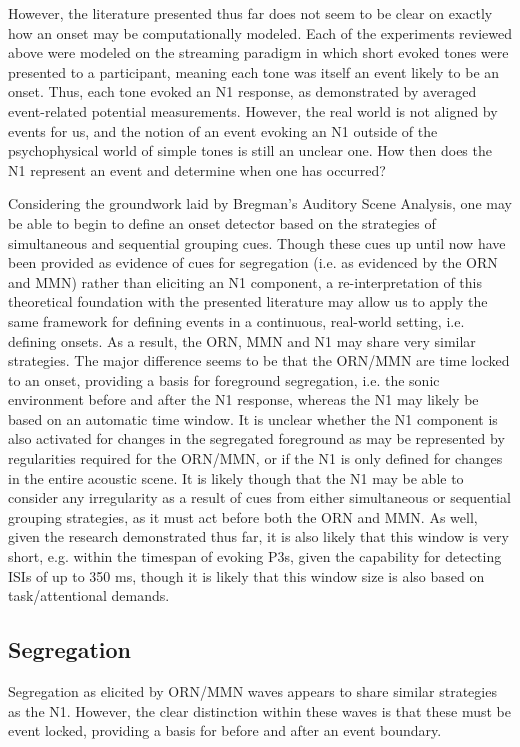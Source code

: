 \documentclass[a4paper,10pt,final]{ThesisStyle}
\begin{document}
However, the literature presented thus far does not seem to be clear on exactly how an onset may be computationally modeled.  Each of the experiments reviewed above were modeled on the streaming paradigm in which short evoked tones were presented to a participant, meaning each tone was itself an event likely to be an onset.  Thus, each tone evoked an N1 response, as demonstrated by averaged event-related potential measurements.  However, the real world is not aligned by events for us, and the notion of an event evoking an N1 outside of the psychophysical world of simple tones is still an unclear one.  How then does the N1 represent an event and determine when one has occurred?

Considering the groundwork laid by Bregman's Auditory Scene Analysis, one may be able to begin to define an onset detector based on the strategies of simultaneous and sequential grouping cues.  Though these cues up until now have been provided as evidence of cues for segregation (i.e. as evidenced by the ORN and MMN) rather than eliciting an N1 component, a re-interpretation of this theoretical foundation with the presented literature may allow us to apply the same framework for defining events in a continuous, real-world setting, i.e. defining onsets.  As a result, the ORN, MMN and N1 may share very similar strategies.  The major difference seems to be that the ORN/MMN are time locked to an onset, providing a basis for foreground segregation, i.e. the sonic environment before and after the N1 response, whereas the N1 may likely be based on an automatic time window.  It is unclear whether the N1 component is also activated for changes in the segregated foreground as may be represented by regularities required for the ORN/MMN, or if the N1 is only defined for changes in the entire acoustic scene.  It is likely though that the N1 may be able to consider any irregularity as a result of cues from either simultaneous or sequential grouping strategies, as it must act before both the ORN and MMN.  As well, given the research demonstrated thus far, it is also likely that this window is very short, e.g. within the timespan of evoking P3s, given the capability for detecting ISIs of up to 350 ms, though it is likely that this window size is also based on task/attentional demands.  

\subsection{Segregation}

Segregation as elicited by ORN/MMN waves appears to share similar strategies as the N1.  However, the clear distinction within these waves is that these must be event locked, providing a basis for before and after an event boundary.  
\end{document}
